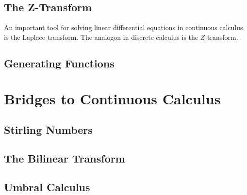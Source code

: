 \subsection{The Z-Transform}
An important tool for solving linear differential equations in continuous calculus is the Laplace transform. The analogon in discrete calculus is the $Z$-transform. 






\subsection{Generating Functions}



\section{Bridges to Continuous Calculus}


\subsection{Stirling Numbers}



\subsection{The Bilinear Transform}


\subsection{Umbral Calculus}

